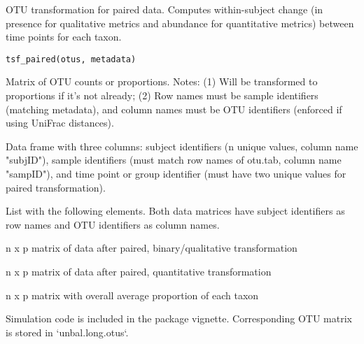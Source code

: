 \documentclass[a4paper]{book}
\begin{document}
%
\begin{Description}\relax
OTU transformation for paired data. Computes within-subject change (in presence 
for qualitative metrics and abundance for quantitative metrics) between time 
points for each taxon.
\end{Description}
%
\begin{Usage}
\begin{verbatim}
tsf_paired(otus, metadata)
\end{verbatim}
\end{Usage}
%
\begin{Arguments}
\begin{ldescription}
\item[\code{otus}] Matrix of OTU counts or proportions. Notes: (1) Will be transformed to 
proportions if it's not already; (2) Row names must be sample identifiers 
(matching metadata), and column names must be OTU identifiers (enforced if 
using UniFrac distances).

\item[\code{metadata}] Data frame with three columns: subject identifiers (n unique values, column name "subjID"), 
sample identifiers (must match row names of otu.tab, column name "sampID"), 
and time point or group identifier (must have two unique values for paired transformation).
\end{ldescription}
\end{Arguments}
%
\begin{Value}
List with the following elements. Both data matrices have subject identifiers 
as row names and OTU identifiers as column names.  
\begin{ldescription}
\item[\code{dat.binary}] n x p matrix of data after paired, binary/qualitative transformation
\item[\code{dat.quant}] n x p matrix of data after paired, quantitative transformation
\item[\code{avg.prop}] n x p matrix with overall average proportion of each taxon
\end{ldescription}
\end{Value}
%
\begin{Description}\relax
Simulation code is included in the package vignette. 
Corresponding OTU matrix is stored in `unbal.long.otus`.
\end{Description}
\end{document}
